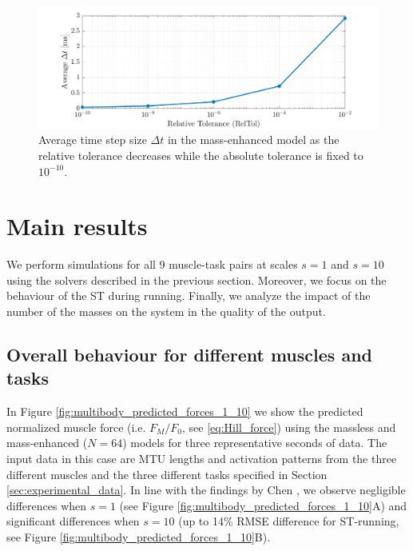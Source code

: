 \documentclass{sfuthesis}
\numberwithin{equation}{section}
\numberwithin{figure}{chapter}
\numberwithin{table}{chapter}
\theoremstyle{definition}
\begin{document}
\begin{figure}
    \centering
    \includegraphics[width=\textwidth]{convergence_dt.png}
    \caption{Average time step size $\Delta t$ in the mass-enhanced model as the relative tolerance decreases while the absolute tolerance is fixed to $10^{-10}$.}
    \label{fig:multibody-reltol-avg-deltat}
\end{figure}


\section{Main results}

We perform simulations for all 9 muscle-task pairs at scales $s=1$ and $s=10$ using the solvers described in the previous section. Moreover, we focus on the behaviour of the ST during running. Finally, we analyze the impact of the number of the masses on the system in the quality of the output.

\subsection{Overall behaviour for different muscles and tasks}

In Figure \ref{fig:multibody_predicted_forces_1_10} we show the predicted normalized muscle force (i.e. $F_M/F_0$, see \eqref{eq:Hill_force}) using the massless and mass-enhanced ($N = 64$) models for three representative seconds of data. The input data in this case are MTU lengths and activation patterns from the three different muscles and the three different tasks specified in Section \ref{sec:experimental_data}. In line with the findings by Chen \cite{EvanThesis}, we observe negligible differences when $s=1$ (see Figure \ref{fig:multibody_predicted_forces_1_10}A) and significant differences when $s=10$ (up to 14\% RMSE difference for ST-running, see Figure \ref{fig:multibody_predicted_forces_1_10}B).
\end{document}
